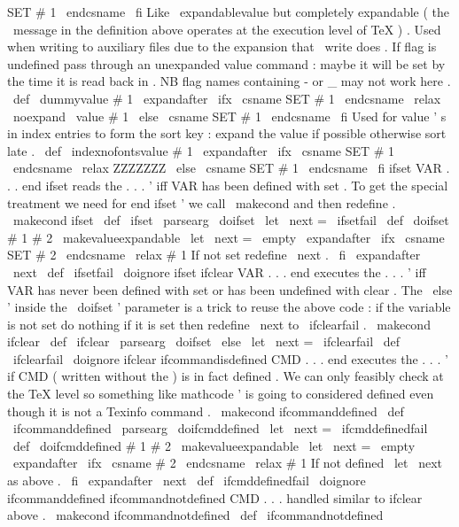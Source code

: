 {{{{{SET
#
1
\
endcsname
\
fi
}
%
Like
\
expandablevalue
but
completely
expandable
(
the
\
message
in
the
%
definition
above
operates
at
the
execution
level
of
TeX
)
.
Used
when
%
writing
to
auxiliary
files
due
to
the
expansion
that
\
write
does
.
%
If
flag
is
undefined
pass
through
an
unexpanded
value
command
:
maybe
it
%
will
be
set
by
the
time
it
is
read
back
in
.
%
%
NB
flag
names
containing
-
or
_
may
not
work
here
.
\
def
\
dummyvalue
#
1
{
%
\
expandafter
\
ifx
\
csname
SET
#
1
\
endcsname
\
relax
\
noexpand
\
value
{
#
1
}
%
\
else
\
csname
SET
#
1
\
endcsname
\
fi
}
%
Used
for
value
'
s
in
index
entries
to
form
the
sort
key
:
expand
the
value
%
if
possible
otherwise
sort
late
.
\
def
\
indexnofontsvalue
#
1
{
%
\
expandafter
\
ifx
\
csname
SET
#
1
\
endcsname
\
relax
ZZZZZZZ
\
else
\
csname
SET
#
1
\
endcsname
\
fi
}
%
ifset
VAR
.
.
.
end
ifset
reads
the
.
.
.
'
iff
VAR
has
been
defined
%
with
set
.
%
%
To
get
the
special
treatment
we
need
for
end
ifset
'
we
call
%
\
makecond
and
then
redefine
.
%
\
makecond
{
ifset
}
\
def
\
ifset
{
\
parsearg
{
\
doifset
{
\
let
\
next
=
\
ifsetfail
}
}
}
\
def
\
doifset
#
1
#
2
{
%
{
%
\
makevalueexpandable
\
let
\
next
=
\
empty
\
expandafter
\
ifx
\
csname
SET
#
2
\
endcsname
\
relax
#
1
%
If
not
set
redefine
\
next
.
\
fi
\
expandafter
}
\
next
}
\
def
\
ifsetfail
{
\
doignore
{
ifset
}
}
%
ifclear
VAR
.
.
.
end
executes
the
.
.
.
'
iff
VAR
has
never
been
%
defined
with
set
or
has
been
undefined
with
clear
.
%
%
The
\
else
'
inside
the
\
doifset
'
parameter
is
a
trick
to
reuse
the
%
above
code
:
if
the
variable
is
not
set
do
nothing
if
it
is
set
%
then
redefine
\
next
to
\
ifclearfail
.
%
\
makecond
{
ifclear
}
\
def
\
ifclear
{
\
parsearg
{
\
doifset
{
\
else
\
let
\
next
=
\
ifclearfail
}
}
}
\
def
\
ifclearfail
{
\
doignore
{
ifclear
}
}
%
ifcommandisdefined
CMD
.
.
.
end
executes
the
.
.
.
'
if
CMD
(
written
%
without
the
)
is
in
fact
defined
.
We
can
only
feasibly
check
at
the
%
TeX
level
so
something
like
mathcode
'
is
going
to
considered
%
defined
even
though
it
is
not
a
Texinfo
command
.
%
\
makecond
{
ifcommanddefined
}
\
def
\
ifcommanddefined
{
\
parsearg
{
\
doifcmddefined
{
\
let
\
next
=
\
ifcmddefinedfail
}
}
}
%
\
def
\
doifcmddefined
#
1
#
2
{
{
%
\
makevalueexpandable
\
let
\
next
=
\
empty
\
expandafter
\
ifx
\
csname
#
2
\
endcsname
\
relax
#
1
%
If
not
defined
\
let
\
next
as
above
.
\
fi
\
expandafter
}
\
next
}
\
def
\
ifcmddefinedfail
{
\
doignore
{
ifcommanddefined
}
}
%
ifcommandnotdefined
CMD
.
.
.
handled
similar
to
ifclear
above
.
\
makecond
{
ifcommandnotdefined
}
\
def
\
ifcommandnotdefined
}}}}

